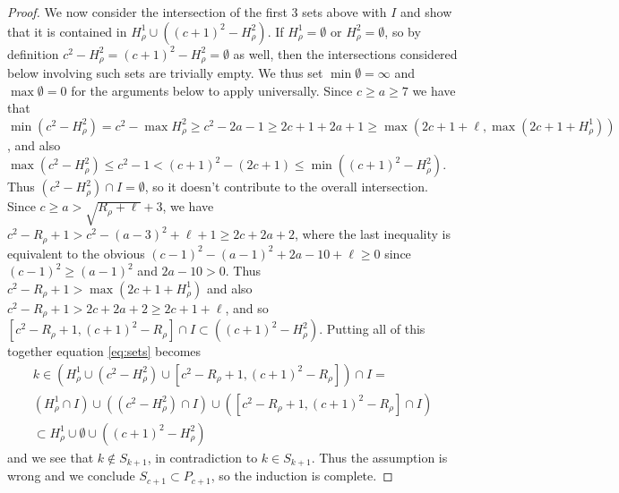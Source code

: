 \documentclass{article}
\numberwithin{equation}{section}
\theoremstyle{definition}
\begin{document}
\begin{proof}
We now consider the intersection of the first 3 sets above with $I$ and show that it is contained in  $H^1_\rho \cup ((c+1)^2-H^2_\rho)$. If $H^1_\rho = \emptyset$ or $H^2_\rho=\emptyset$, so by definition $c^2 - H^2_\rho=(c+1)^2-H^2_\rho = \emptyset$ as well, then the  intersections considered below involving such sets are trivially empty. We thus set $\min \emptyset = \infty$ and $\max \emptyset =0$ for the arguments below to apply universally. 
Since $c \geq a \geq 7$ we have that 
$\min (c^2 - H^2_\rho) = c^2 - \max H^2_\rho \geq c^2-2a-1 \geq 2c+1+2a+1 \geq \max(2c+1+\ell, \max(2c+1+H^1_\rho))$, and also $\max (c^2 - H^2_\rho ) \leq c^2 - 1 < (c+1)^2 -(2c+1) \leq \min ((c+1)^2-H^2_\rho)$. Thus $(c^2 -H^2_\rho) \cap I=\emptyset$, so it doesn't contribute to the overall intersection. Since $c\geq a > \sqrt{R_\rho+\ell}+3$, we have $c^2 -R_\rho +1 > c^2 - (a-3)^2 +\ell+1 \geq 2c+2a+2$, where the last inequality is equivalent to the obvious $(c-1)^2-(a-1)^2 +2a -10 +\ell \geq 0$ since $(c-1)^2 \geq (a-1)^2$ and $2a-10 > 0$. Thus $c^2 -R_\rho+1 > \max(2c+1+H^1_\rho)$ and also $c^2-R_\rho+1 > 2c+2a+2 \geq 2c+1+\ell$, and so $[c^2\!-\!R_\rho\!+\!1,(c\!+\!1)^2\!-\!R_\rho] \cap I \subset ((c\!+\!1)^2\! -\! H^2_\rho)$. Putting all of this together equation \eqref{eq:sets} becomes
\begin{eqnarray*}
 k \in \left(  H^1_\rho \cup (c^2 \! - \! H^2_\rho) \cup [c^2\!-\! R_\rho\!+\! 1,(c\!+\!1)^2\!-\!R_\rho] \right)  \cap I 
=\\  \left(  H^1_\rho \cap I \right) \! \cup \! \left( (c^2 \! - \! H^2_\rho)\cap I \right) \! \cup \! \left(  [c^2\!-\! R_\rho\!+\! 1,(c\!+\!1)^2\!-\!R_\rho] \cap I \right) \\
\subset H^1_\rho \cup \emptyset \cup  ((c\!+\!1)^2\! -\! H^2_\rho) %
 \end{eqnarray*}
and we see that $k \notin S_{k+1}$, in contradiction to $k \in S_{k+1}$.
Thus the assumption is wrong and we conclude $S_{c+1} \subset P_{c+1}$, so the induction is complete.
\end{proof}
\end{document}
